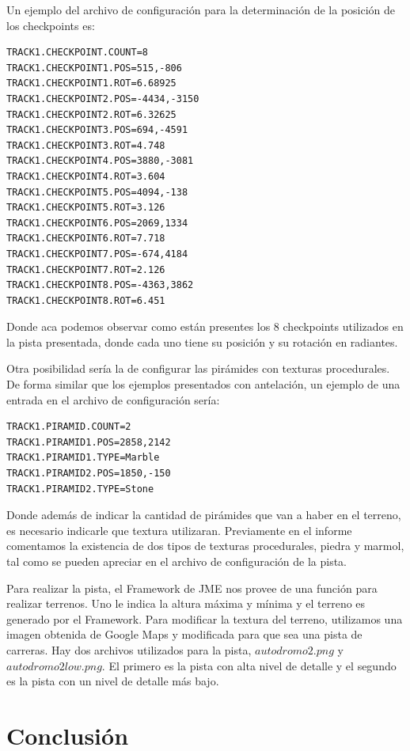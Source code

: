\documentclass[a4paper,10pt]{article}
\begin{document}
Un ejemplo del archivo de configuraci\'on para la determinaci\'on de la
posici\'on
de
los checkpoints es:

\begin{verbatim}
TRACK1.CHECKPOINT.COUNT=8
TRACK1.CHECKPOINT1.POS=515,-806
TRACK1.CHECKPOINT1.ROT=6.68925
TRACK1.CHECKPOINT2.POS=-4434,-3150
TRACK1.CHECKPOINT2.ROT=6.32625
TRACK1.CHECKPOINT3.POS=694,-4591
TRACK1.CHECKPOINT3.ROT=4.748
TRACK1.CHECKPOINT4.POS=3880,-3081
TRACK1.CHECKPOINT4.ROT=3.604
TRACK1.CHECKPOINT5.POS=4094,-138
TRACK1.CHECKPOINT5.ROT=3.126
TRACK1.CHECKPOINT6.POS=2069,1334
TRACK1.CHECKPOINT6.ROT=7.718
TRACK1.CHECKPOINT7.POS=-674,4184
TRACK1.CHECKPOINT7.ROT=2.126
TRACK1.CHECKPOINT8.POS=-4363,3862
TRACK1.CHECKPOINT8.ROT=6.451
\end{verbatim}

Donde aca podemos observar como est\'an presentes los 8 checkpoints utilizados
en
la pista presentada, donde cada uno tiene su posici\'on y su rotaci\'on en
radiantes.

Otra posibilidad ser\'ia la de configurar las pir\'amides con texturas
procedurales.  De forma similar que los ejemplos presentados con antelaci\'on,
un
ejemplo de una entrada en el archivo de configuraci\'on ser\'ia:

\begin{verbatim}
TRACK1.PIRAMID.COUNT=2
TRACK1.PIRAMID1.POS=2858,2142
TRACK1.PIRAMID1.TYPE=Marble
TRACK1.PIRAMID2.POS=1850,-150
TRACK1.PIRAMID2.TYPE=Stone
\end{verbatim}

Donde adem\'as de indicar la cantidad de pir\'amides que van a haber en el
terreno,
es necesario indicarle que textura utilizaran.  Previamente en el informe
comentamos la existencia de dos tipos de texturas procedurales, piedra y
marmol, tal como se pueden apreciar en el archivo de configuraci\'on de la
pista.

Para realizar la pista, el Framework de JME nos provee de una funci\'on para
realizar terrenos.  Uno le indica la altura m\'axima y m\'inima y el terreno es
generado por el Framework.  Para modificar la textura del terreno, utilizamos
una imagen obtenida de Google Maps y modificada para que sea una pista de
carreras.  Hay dos archivos utilizados para la pista, $autodromo2.png$ y
$autodromo2low.png$.  El primero es la pista con alta nivel de detalle y el
segundo es la pista con un nivel de detalle m\'as bajo.

\section{Conclusi\'on}
\label{conclusiones}
\end{document}
